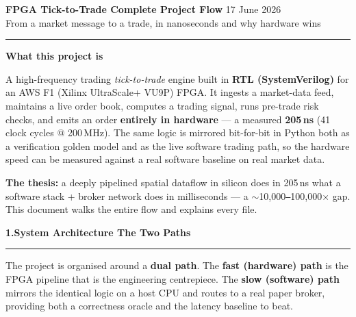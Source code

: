 \documentclass[10pt,a4paper]{article}
\newcommand{\sectionrule}{\par\nobreak\vspace{1pt}\textcolor{rulegray}{\rule{\linewidth}{0.8pt}}\par\vspace{1pt}}
\begin{document}
{\LARGE\bfseries\color{hdrblue} FPGA Tick-to-Trade \textendash{} Complete Project Flow}%
\hfill{\small\color{rulegray} 17 June 2026}\\[-2pt]
{\large\color{accentteal} From a market message to a trade, in nanoseconds \textendash{} and why hardware wins}

\textcolor{hdrblue}{\rule{\linewidth}{2pt}}

\begin{keybox}
{\large\bfseries\color{newtext} What this project is}

\smallskip
A high-frequency trading \emph{tick-to-trade} engine built in \textbf{RTL
(SystemVerilog)} for an AWS F1 (Xilinx UltraScale+ VU9P) FPGA. It ingests a
market-data feed, maintains a live order book, computes a trading signal, runs
pre-trade risk checks, and emits an order \textbf{entirely in hardware} --- a
measured \textbf{205\,ns} (41 clock cycles @ 200\,MHz). The same logic is
mirrored bit-for-bit in Python both as a verification golden model and as the
live software trading path, so the hardware speed can be measured against a
real software baseline on real market data.

\smallskip
\textbf{The thesis:} a deeply pipelined spatial dataflow in silicon does in
205\,ns what a software stack + broker network does in milliseconds --- a
$\sim$10{,}000\texttt{--}100{,}000$\times$ gap. This document walks the entire
flow and explains every file.
\end{keybox}

{\large\bfseries\color{hdrblue} 1.\quad System Architecture \textendash{} The Two Paths}
\sectionrule

The project is organised around a \textbf{dual path}. The \textcolor{hdrblue}{\textbf{fast
(hardware) path}} is the FPGA pipeline that is the engineering centrepiece. The
\textcolor{warnamber}{\textbf{slow (software) path}} mirrors the identical logic on a host CPU and routes
to a real paper broker, providing both a correctness oracle and the latency
baseline to beat.
\end{document}
